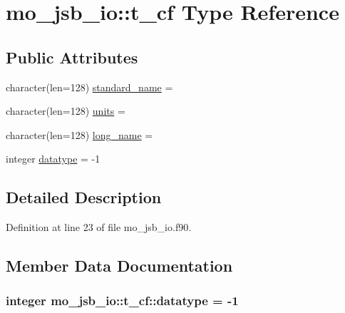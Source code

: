 \hypertarget{structmo__jsb__io_1_1t__cf}{}\section{mo\+\_\+jsb\+\_\+io\+:\+:t\+\_\+cf Type Reference}
\label{structmo__jsb__io_1_1t__cf}
\subsection*{Public Attributes}
\begin{DoxyCompactItemize}
\item 
character(len=128) \hyperlink{structmo__jsb__io_1_1t__cf_a8a9da11d2bd4d2f543e06a246c2c114a}{standard\+\_\+name} = \textquotesingle{}\textquotesingle{}
\item 
character(len=128) \hyperlink{structmo__jsb__io_1_1t__cf_a1cfa1074fe607dc5208584dbbc88bf0f}{units} = \textquotesingle{}\textquotesingle{}
\item 
character(len=128) \hyperlink{structmo__jsb__io_1_1t__cf_a9742db1ca93aa98e36b5cfde04e98ac1}{long\+\_\+name} = \textquotesingle{}\textquotesingle{}
\item 
integer \hyperlink{structmo__jsb__io_1_1t__cf_a29ae869528e37833df723d545766017b}{datatype} = -\/1
\end{DoxyCompactItemize}


\subsection{Detailed Description}


Definition at line 23 of file mo\+\_\+jsb\+\_\+io.\+f90.



\subsection{Member Data Documentation}
\hypertarget{structmo__jsb__io_1_1t__cf_a29ae869528e37833df723d545766017b}{}
\subsubsection[{datatype}]{\setlength{\rightskip}{0pt plus 5cm}integer mo\+\_\+jsb\+\_\+io\+::t\+\_\+cf\+::datatype = -\/1}\label{structmo__jsb__io_1_1t__cf_a29ae869528e37833df723d545766017b}


